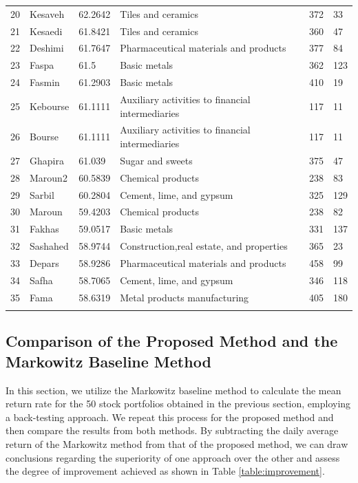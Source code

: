 \documentclass[preprint,12pt,authoryear]{elsarticle}
\begin{document}
\begin{longtable}{ p{} p{} p{} p{} p{} p{} }
20 & Kesaveh & 62.2642 & Tiles and ceramics & 372 & 33 \\ 
21 & Kesaedi & 61.8421 & Tiles and ceramics & 360 & 47 \\ 
22 & Deshimi & 61.7647 & Pharmaceutical materials and products & 377 & 84 \\ 
23 & Faspa & 61.5 & Basic metals & 362 & 123 \\ 
24 & Fasmin & 61.2903 & Basic metals & 410 & 19 \\ 
25 & Kebourse & 61.1111 & Auxiliary activities to financial intermediaries & 117 & 11 \\ 
26 & Bourse & 61.1111 & Auxiliary activities to financial intermediaries & 117 & 11 \\ 
27 & Ghapira & 61.039 & Sugar and sweets & 375 & 47 \\ 
28 & Maroun2 & 60.5839 & Chemical products & 238 & 83 \\ 
29 & Sarbil & 60.2804 & Cement, lime, and gypsum & 325 & 129 \\ 
30 & Maroun & 59.4203 & Chemical products & 238 & 82 \\ 
31 & Fakhas & 59.0517 & Basic metals & 331 & 137 \\ 
32 & Sashahed & 58.9744 & Construction,real estate, and properties & 365 & 23 \\ 
33 & Depars & 58.9286 & Pharmaceutical materials and products & 458 & 99 \\ 
34 & Safha & 58.7065 & Cement, lime, and gypsum & 346 & 118 \\ 
35 & Fama & 58.6319 & Metal products manufacturing & 405 & 180 \\ \hline
\label{tab:myfirstlongtable}
\end{longtable}


\subsection{Comparison of the Proposed Method and the Markowitz Baseline Method}
In this section, we utilize the Markowitz baseline method to calculate the mean return rate for the 50 stock portfolios obtained in the previous section, employing a back-testing approach. We repeat this process for the proposed method and then compare the results from both methods. By subtracting the daily average return of the Markowitz method from that of the proposed method, we can draw conclusions regarding the superiority of one approach over the other and assess the degree of improvement achieved as shown in Table \ref{table:improvement}.
\end{document}

